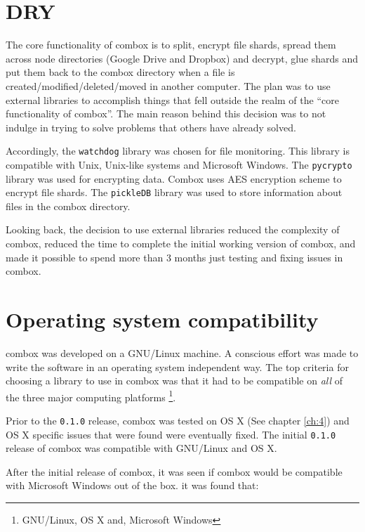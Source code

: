 \section{DRY}

The core functionality of combox is to split, encrypt file shards,
spread them across node directories (Google Drive and Dropbox) and
decrypt, glue shards and put them back to the combox directory when a
file is created/modified/deleted/moved in another computer. The plan
was to use external libraries to accomplish things that fell outside
the realm of the ``core functionality of combox''. The main reason
behind this decision was to not indulge in trying to solve problems
that others have already solved.

Accordingly, the \verb+watchdog+ \cite{pylib:watchdog} library was
chosen for file monitoring. This library is compatible with Unix,
Unix-like systems and Microsoft Windows. The \verb+pycrypto+ library
\cite{pylib:pycrypto} was used for encrypting data. Combox uses AES
encryption scheme to encrypt file shards. The \verb+pickleDB+
\cite{pylib:pickledb} library was used to store information about
files in the combox directory.

Looking back, the decision to use external libraries reduced the
complexity of combox, reduced the time to complete the initial working
version of combox, and made it possible to spend more than 3 months
just testing and fixing issues in combox.

\section{Operating system compatibility}\label{3-os-compat}

combox was developed on a GNU/Linux machine. A conscious effort was
made to write the software in an operating system independent way. The
top criteria for choosing a library to use in combox was that it had
to be compatible on \emph{all} of the three major computing platforms
\footnote{GNU/Linux, OS X and, Microsoft Windows}.

Prior to the \verb+0.1.0+ release, combox was tested on OS X (See
chapter \ref{ch:4}) and OS X specific issues that were found were
eventually fixed. The initial \verb+0.1.0+ release of combox was
compatible with GNU/Linux and OS X.

After the initial release of combox, it was seen if combox would be
compatible with Microsoft Windows out of the box. it was found that:

